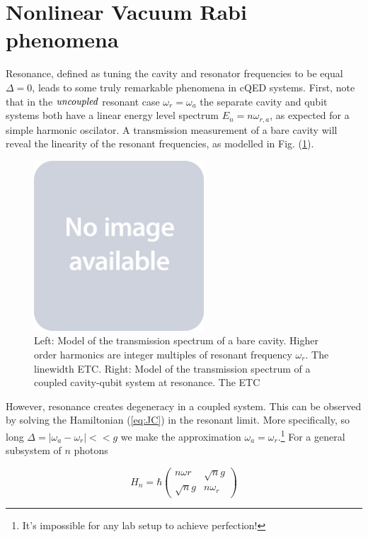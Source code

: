 \documentclass[12 pt]{book}
\begin{document}
\section{Nonlinear Vacuum Rabi phenomena}\label{sec:Rabi}
Resonance, defined as tuning the cavity and resonator frequencies to be equal $\Delta=0$, leads to some truly remarkable phenomena in cQED systems. First, note that in the $\emph{uncoupled}$ resonant case $\omega_r=\omega_a$ the separate cavity and qubit systems both have a linear energy level spectrum $E_n=n\omega_{r,a}$, as expected for a simple harmonic oscilator. A transmission measurement of a bare cavity will reveal the linearity of the resonant frequencies, as modelled in Fig. (\ref{fig:Transmission1}).

\begin{figure}[h] 
   \centering
   \includegraphics[width=2.5in]{placeholder.jpg} 
   \caption{Left: Model of the transmission spectrum of a bare cavity. Higher order harmonics are integer multiples of resonant frequency $\omega_r$. The linewidth ETC. Right: Model of the transmission spectrum of a coupled cavity-qubit system at resonance. The ETC}
   \label{fig:Transmission1}
\end{figure}

However, resonance creates degeneracy in a coupled system. This can be observed by solving the Hamiltonian (\ref{eq:JC}) in the resonant limit. More specifically, so long $\Delta=|\omega_a-\omega_r|<<g$ we make the approximation $\omega_a=\omega_r$.\footnote{It's impossible for any lab setup to achieve perfection!} For a general subsystem of $n$ photons

\begin{equation}
H_n = \hbar \left( \begin{array}{cc}
n\omega{r} & \sqrt{n}g \\
\sqrt{n}g & n\omega_r
\end{array}\right)
\end{equation}
\end{document}
